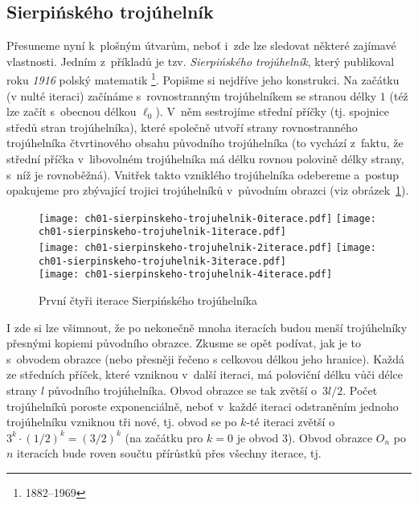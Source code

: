 \subsection{Sierpińského trojúhelník}\label{subsec:sierpinskeho_trojuhelnik}
Přesuneme nyní k~plošným útvarům, neboť i~zde lze sledovat některé zajímavé vlastnosti. Jedním z~příkladů je tzv. \emph{Sierpińského trojúhelník}, který publikoval roku \emph{1916} polský matematik \footnote{1882--1969}. \citep[str. 61]{Peitgen2004} Popišme si nejdříve jeho konstrukci. Na začátku (v nulté iteraci) začínáme s~rovnostranným trojúhelníkem se stranou délky $1$ (též lze začít s~obecnou délkou $\ell_0$). V~něm sestrojíme střední příčky (tj. spojnice středů stran trojúhelníka), které společně utvoří strany rovnostranného trojúhelníka čtvrtinového obsahu původního trojúhelníka (to vychází z~faktu, že střední příčka v~libovolném trojúhelníka má délku rovnou polovině délky strany, s~níž je rovnoběžná). Vnitřek takto vzniklého trojúhelníka odebereme a~postup opakujeme pro zbývající trojici trojúhelníků v~původním obrazci (viz obrázek~\ref{fig:sierpinskeho-trojuhelnik-5iteraci}).\par
\begin{figure}[h]
    \centering
    \texttt{[image: ch01-sierpinskeho-trojuhelnik-0iterace.pdf]}\qquad
    \texttt{[image: ch01-sierpinskeho-trojuhelnik-1iterace.pdf]}\qquad\\
    \texttt{[image: ch01-sierpinskeho-trojuhelnik-2iterace.pdf]}\qquad
    \texttt{[image: ch01-sierpinskeho-trojuhelnik-3iterace.pdf]}\qquad\\
    \texttt{[image: ch01-sierpinskeho-trojuhelnik-4iterace.pdf]}
    \caption{První čtyři iterace Sierpińského trojúhelníka}
    \label{fig:sierpinskeho-trojuhelnik-5iteraci}
\end{figure}
I zde si lze všimnout, že po nekonečně mnoha iteracích budou menší trojúhelníky přesnými kopiemi původního obrazce. Zkusme se opět podívat, jak je to s~obvodem obrazce (nebo přesněji řečeno s celkovou délkou jeho hranice). Každá ze středních příček, které vzniknou v~další iteraci, má poloviční délku vůči délce strany $l$ původního trojúhelníka. Obvod obrazce se tak zvětší o~$3l/2$. Počet trojúhelníků poroste exponenciálně, neboť v~každé iteraci odstraněním jednoho trojúhelníku vzniknou tři nové, tj. obvod se po $k$-té iteraci zvětší o~$3^k\cdot(1/2)^k=(3/2)^k$ (na začátku pro $k=0$ je obvod $3$). Obvod obrazce $O_n$ po $n$ iteracích bude roven součtu přírůstků přes všechny iterace, tj.
